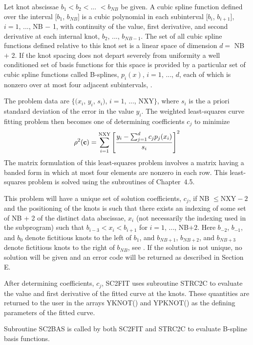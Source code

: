 \documentclass[twoside]{MATH77}
\begin{document}
Let knot abscissae $b_1 < b_2 < ..$.  $< b_{NB}$ be given.  A cubic spline
function defined over the interval $[b_1$, $b_{NB}]$ is a cubic polynomial
in each subinterval $[b_i$, $b_{i+1}]$, $i = 1$, ..., NB $-$ 1, with
continuity of the value, first derivative, and second derivative at each
internal knot, $b_2$, ..., $b_{NB-1}$.  The set of all cubic spline
functions defined relative to this knot set is a linear space of dimension
$d =$ NB $+$ 2.  If the knot spacing does not depart severely from
uniformity a well conditioned set of basis functions for this space is
provided by a particular set of cubic spline functions called B-splines,
$p_i(x)$, $i = 1$, ..., $d$, each of which is nonzero over at most four
adjacent subintervals, \cite{deBoor:1972:OCB}.

The problem data are $\{(x_i$, $y_i$, $s_i)$, $i=1$, ..., NXY$\}$, where $s_i$
is the a priori standard deviation of the error in the value $y_i$. The
weighted least-squares curve fitting problem then becomes one of determining
coefficients $c_j$ to minimize%
\begin{equation*}
\rho ^2({\bf c})=\sum_{i=1}^{\text{NXY}}\left[ \frac{
y_i-\sum_{j=1}^dc_jp_j(x_i)}{s_i}\right] ^2
\end{equation*}
The matrix formulation of this least-squares problem involves a matrix
having a banded form in which at most four elements are nonzero in each row.
This least-squares problem is solved using the subroutines of Chapter~4.5.

This problem will have a unique set of solution coefficients, $c_j$, if NB
$\leq \text{NXY}-2$ and the positioning of the knots is such that there
exists an indexing of some set of NB + 2 of the distinct data abscissae,
$x_i$ (not necessarily the indexing used in the subprogram) such that
$b_{i-3} < x_i < b_{i+1}$ for $i = 1$, ..., NB$+2$.  Here $b_{-2}$,
$b_{-1}$, and $b_0$ denote fictitious knots to the left of $b_1$, and
$b_{NB+1}$, $b_{NB+2}$, and $b_{NB+3}$ denote fictitious knots to the
right of $b_{NB}$, see \cite{Rice:COC:1967}.  If the solution is not
unique, no solution will be given and an error code will be returned as
described in Section E.

After determining coefficients, $c_j$, SC2FIT uses subroutine STRC2C to
evaluate the value and first derivative of the fitted curve at the knots.
These quantities are returned to the user in the arrays YKNOT() and YPKNOT()
as the defining parameters of the fitted curve.

Subroutine SC2BAS is called by both SC2FIT and STRC2C to evaluate B-spline
basis functions.
\end{document}
